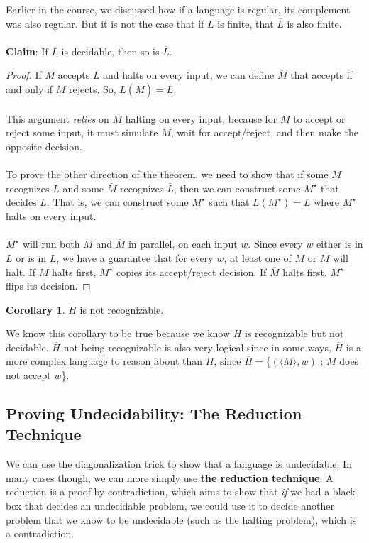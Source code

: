 \documentclass[]{article}
\theoremstyle{definition}
\newtheorem*{corollary}{Corollary}
\begin{document}
      Earlier in the course, we discussed how if a language is regular, its complement was also regular. But it is not the case that if $L$ is finite, that $\overline{L}$ is also finite.
      \\ \\
      \textbf{Claim}: If $L$ is decidable, then so is $\overline{L}$.
      \begin{proof}
        If $M$ accepts $L$ and halts on every input, we can define $\overline{M}$ that accepts if and only if $M$ rejects. So, $L(\overline{M}) = \overline{L}$.
        \\ \\
        This argument \emph{relies} on $M$ halting on every input, because for $\overline{M}$ to accept or reject some input, it must simulate $M$, wait for accept/reject, and then make the opposite decision.
        \\ \\
        To prove the other direction of the theorem, we need to show that if some $M$ recognizes $L$ and some $\overline{M}$ recognizes $\overline{L}$, then we can construct some $M^\star$ that decides $L$. That is, we can construct some $M^\star$ such that $L(M^\star) = L$ where $M^\star$ halts on every input.
        \\ \\
        $M^\star$ will run both $M$ and $\overline{M}$ in parallel, on each input $w$. Since every $w$ either is in $L$ or is in $\overline{L}$, we have a guarantee that for every $w$, at least one of $M$ or $\overline{M}$ will halt. If $M$ halts first, $M^\star$ copies its accept/reject decision. If $\overline{M}$ halts first, $M^\star$ flips its decision.
      \end{proof}

      \begin{corollary}
        $\overline{H}$ is not recognizable.
      \end{corollary}

      We know this corollary to be true because we know $H$ is recognizable but not decidable. $\overline{H}$ not being recognizable is also very logical since in some ways, $\overline{H}$ is a more complex language to reason about than $H$, since $\overline{H} = $\{$(\langle M \rangle, w)$ : $M$ does not accept $w$\}.

    \subsection{Proving Undecidability: The Reduction Technique}
      We can use the diagonalization trick to show that a language is undecidable. In many cases though, we can more simply use \textbf{the reduction technique}. A reduction is a proof by contradiction, which aims to show that \emph{if} we had a black box that decides an undecidable problem, we could use it to decide another problem that we know to be undecidable (such as the halting problem), which is a contradiction.
\end{document}
